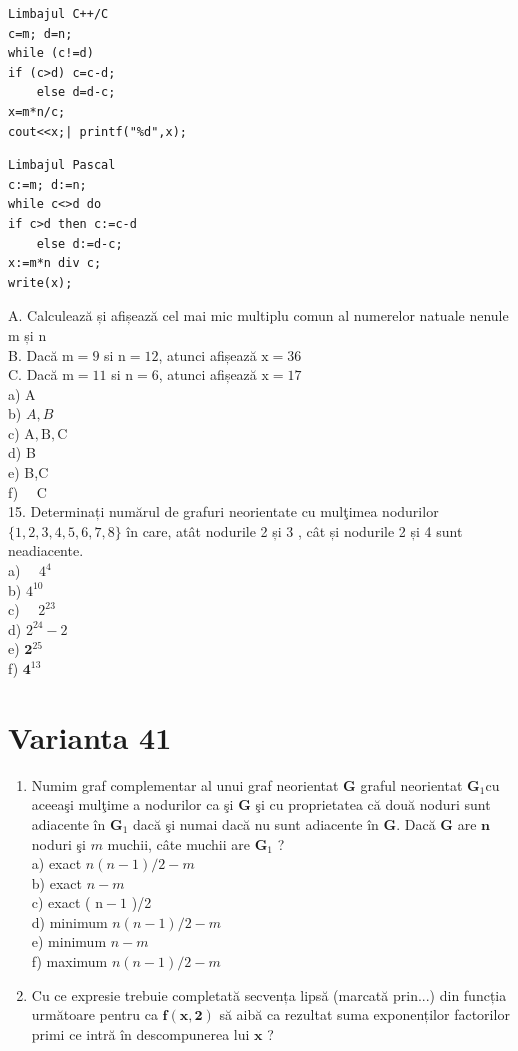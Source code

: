 \documentclass[10pt]{article}
\begin{document}
\begin{verbatim}
Limbajul C++/C
c=m; d=n;
while (c!=d)
if (c>d) c=c-d;
    else d=d-c;
x=m*n/c;
cout<<x;| printf("%d",x);
\end{verbatim}

\begin{verbatim}
Limbajul Pascal
c:=m; d:=n;
while c<>d do
if c>d then c:=c-d
    else d:=d-c;
x:=m*n div c;
write(x);
\end{verbatim}

A. Calculează și afișează cel mai mic multiplu comun al numerelor natuale nenule m și n\\
B. Dacă $\mathrm{m}=9$ si $\mathrm{n}=12$, atunci afișează $\mathrm{x}=36$\\
C. Dacă $\mathrm{m}=11$ si $\mathrm{n}=6$, atunci afișează $\mathrm{x}=17$\\
a) A\\
b) $A, B$\\
c) $\mathrm{A}, \mathrm{B}, \mathrm{C}$\\
d) B\\
e) B,C\\
f) $\quad \mathrm{C}$\\
15. Determinați numărul de grafuri neorientate cu mulţimea nodurilor $\{1,2,3,4,5,6,7,8\}$ în care, atât nodurile 2 și 3 , cât și nodurile 2 și 4 sunt neadiacente.\\
a) $\quad 4^{4}$\\
b) $4^{10}$\\
c) $\quad 2^{23}$\\
d) $2^{24}-2$\\
e) $\mathbf{2}^{25}$\\
f) $\mathbf{4}^{13}$

\section*{Varianta 41}
\begin{enumerate}
  \item Numim graf complementar al unui graf neorientat $\mathbf{G}$ graful neorientat $\mathbf{G}_{1} \mathrm{cu}$ aceeaşi mulţime a nodurilor ca şi $\mathbf{G}$ şi cu proprietatea că două noduri sunt adiacente în $\mathbf{G}_{1}$ dacă şi numai dacă nu sunt adiacente în $\mathbf{G}$. Dacă $\mathbf{G}$ are $\mathbf{n}$ noduri şi $m$ muchii, câte muchii are $\mathbf{G}_{1}$ ?\\
a) exact $n(n-1) / 2-m$\\
b) exact $n-m$\\
c) exact ( $\mathrm{n}-1$ )/2\\
d) minimum $n(n-1) / 2-m$\\
e) minimum $n-m$\\
f) maximum $n(n-1) / 2-m$
  \item Cu ce expresie trebuie completată secvența lipsă (marcată prin...) din funcția următoare pentru ca $\mathbf{f ( x , 2 )}$ să aibă ca rezultat suma exponenților factorilor primi ce intră în descompunerea lui $\mathbf{x}$ ?
\end{enumerate}
\end{document}
